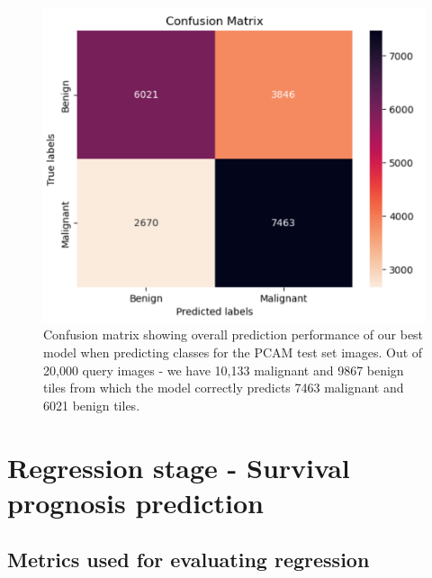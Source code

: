 \documentclass{l4proj}
\begin{document}
\begin{figure}[h]
    \centering
    \includegraphics[scale=0.3]{images/confusion-matrix.png}
    \caption{Confusion matrix showing overall prediction performance of our best model when predicting classes for the PCAM test set images. Out of 20,000 query images - we have 10,133 malignant and 9867 benign tiles from which the model correctly predicts 7463 malignant and 6021 benign tiles.}
    \label{fig:result-conf-mat}
\end{figure}



\section{Regression stage - Survival prognosis prediction}
\subsection{Metrics used for evaluating regression}
\end{document}
